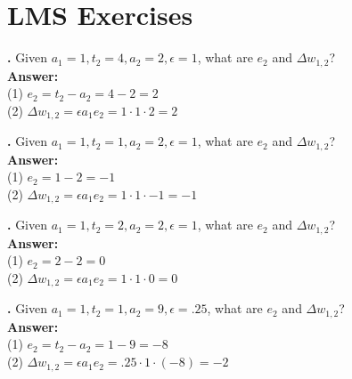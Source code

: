 
\section{LMS Exercises}




\noindent
{}
{\bf \theLMSCounter.}  Given $a_1 = 1, t_2 = 4, a_2 = 2, \epsilon = 1$, what are $e_2$ and $\Delta w_{1,2}$? \\
{\bf Answer:}  \\
(1) $e_2 = t_2 - a_2 = 4 - 2  = 2 $ \\
(2) $\Delta w_{1,2} = \epsilon a_1 e_2 = 1 \cdot 1 \cdot  2 = 2$
\bigskip

\noindent
{}
{\bf \theLMSCounter.}  Given $a_1 = 1, t_2 = 1, a_2 = 2, \epsilon = 1$, what are $e_2$ and $\Delta w_{1,2}$? \\
{\bf Answer:}  \\
(1) $e_2 = 1 - 2  = -1 $ \\
(2) $\Delta w_{1,2} = \epsilon a_1 e_2 = 1 \cdot 1 \cdot  -1 = -1$
\bigskip

\noindent
{}
{\bf \theLMSCounter.}  Given $a_1 = 1, t_2 = 2, a_2 = 2, \epsilon = 1$, what are $e_2$ and $\Delta w_{1,2}$? \\
{\bf Answer:}  \\
(1) $e_2 = 2 - 2  = 0 $ \\
(2) $\Delta w_{1,2} = \epsilon a_1 e_2 = 1 \cdot 1 \cdot 0 = 0$
\bigskip

\noindent
{}
{\bf \theLMSCounter.}  Given $a_1 = 1, t_2 = 1, a_2 = 9, \epsilon = .25$, what are $e_2$ and $\Delta w_{1,2}$? \\
{\bf Answer:}  \\
(1) $e_2 = t_2 - a_2 = 1 - 9 = -8 $ \\
(2) $\Delta w_{1,2} = \epsilon a_1 e_2 =  .25 \cdot 1 \cdot (-8)  = -2$
\bigskip


